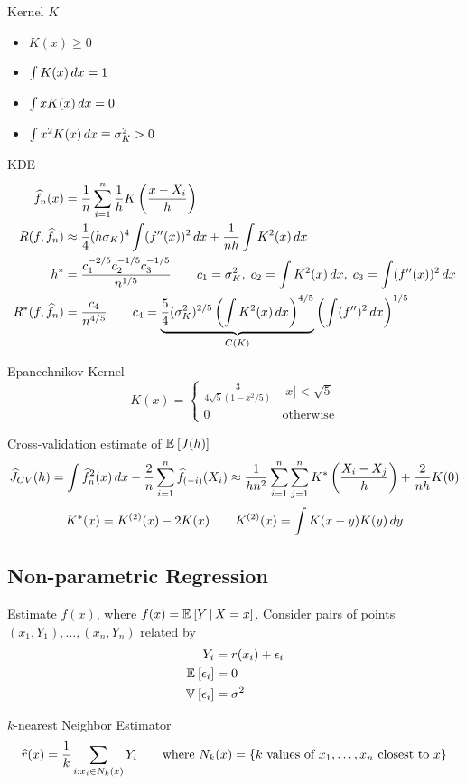 \documentclass[landscape]{article}
\begin{document}
\begin{multicols*}{2}
Kernel $K$
\begin{itemize}
  \item $K(x) \ge 0$
  \item $\int K(x)\,dx = 1$
  \item $\int xK(x)\,dx = 0$
  \item $\int x^2 K(x)\,dx \equiv \sigma^2_K > 0$
\end{itemize}

KDE
\begin{align*}
  \widehat{f}_n(x) &= \frac{1}{n} \sum_{i=1}^n \frac{1}{h} K\left( \frac{x-X_i}{h} \right) \\
  R(f,\widehat{f}_n) &\approx \frac{1}{4}(h\sigma_K)^4 \int (f^{\prime\prime}(x))^2\,dx
  + \frac{1}{nh} \int K^2(x)\,dx \\
  h^* &= \frac{c_1^{-2/5} c_2^{-1/5} c_3^{-1/5}}{n^{1/5}} \qquad
  c_1=\sigma_K^2,\;c_2 = \int K^2(x)\,dx,\;c_3 = \int(f^{\prime\prime}(x))^2\,dx\\
  R^*(f,\widehat{f}_n) &= \frac{c_4}{n^{4/5}} \qquad
  c_4 = \underbrace{\frac{5}{4}(\sigma_K^2)^{2/5} \left(\int
  K^2(x)\,dx\right)^{4/5}}_{C(K)} 
  \left( \int(f^{\prime\prime})^2\,dx \right)^{1/5} 
\end{align*}

Epanechnikov Kernel
$$K(x) = \begin{cases}
  \frac{3}{4\sqrt{5}(1-x^2/5)} & |x| < \sqrt{5} \\ 0 & \text{otherwise}
\end{cases}$$

Cross-validation estimate of $\mathbb{E}_{}\left[J(h)\right]$
$$\widehat{J}_{CV}(h) 
= \int \widehat{f}_n^2(x) \,dx - \frac{2}{n}\sum_{i=1}^n \widehat{f}_{(-i)}(X_i)
\approx \frac{1}{hn^2} \sum_{i=1}^n \sum_{j=1}^n K^*\left( \frac{X_i-X_j}{h} \right) +
\frac{2}{nh} K(0)$$
$$K^*(x) = K^{(2)}(x)-2K(x) \qquad K^{(2)}(x) = \int K(x-y) K(y) \,dy$$

\subsection{Non-parametric Regression}

Estimate $f(x)$, where $f(x) = \mathbb{E}_{}\left[Y \,|\, X=x\right]$. Consider pairs of points
$(x_1,Y_1),\dots,(x_n,Y_n)$ related by 
\begin{align*}
Y_i &= r(x_i) + \epsilon_i \\
\mathbb{E}_{}\left[\epsilon_i\right] &= 0 \\
\mathbb{V}_{}\left[\epsilon_i\right] &= \sigma^2
\end{align*}

$k$-nearest Neighbor Estimator
$$\widehat{r}(x) = \frac{1}{k} \sum_{i:x_i \in N_k(x)} Y_i \qquad \text{where } 
N_k(x) = \{ k \text{ values of } x_1,\dots,x_n \text{ closest to } x \}$$


\end{multicols*}
\end{document}
